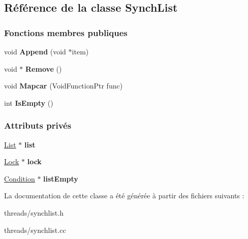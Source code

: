 \hypertarget{class_synch_list}{}\subsection{Référence de la classe Synch\+List}
\label{class_synch_list}
\subsubsection*{Fonctions membres publiques}
\begin{DoxyCompactItemize}
\item 
\hypertarget{class_synch_list_a8cd56b067f02d53025d8078f748e6b75}{}\label{class_synch_list_a8cd56b067f02d53025d8078f748e6b75} 
void {\bfseries Append} (void $\ast$item)
\item 
\hypertarget{class_synch_list_afe8d909e1ab9dce01ddd7d24716be56f}{}\label{class_synch_list_afe8d909e1ab9dce01ddd7d24716be56f} 
void $\ast$ {\bfseries Remove} ()
\item 
\hypertarget{class_synch_list_ac9faf4621078baddee6890b0e184fc2d}{}\label{class_synch_list_ac9faf4621078baddee6890b0e184fc2d} 
void {\bfseries Mapcar} (Void\+Function\+Ptr func)
\item 
\hypertarget{class_synch_list_ab396fbf17dbc09aa77ace8e3e3ac6910}{}\label{class_synch_list_ab396fbf17dbc09aa77ace8e3e3ac6910} 
int {\bfseries Is\+Empty} ()
\end{DoxyCompactItemize}
\subsubsection*{Attributs privés}
\begin{DoxyCompactItemize}
\item 
\hypertarget{class_synch_list_a54823dd859260a340ffbf55adae36d03}{}\label{class_synch_list_a54823dd859260a340ffbf55adae36d03} 
\hyperlink{class_list}{List} $\ast$ {\bfseries list}
\item 
\hypertarget{class_synch_list_a58f52391bca6a2ff302dfed934be8c80}{}\label{class_synch_list_a58f52391bca6a2ff302dfed934be8c80} 
\hyperlink{class_lock}{Lock} $\ast$ {\bfseries lock}
\item 
\hypertarget{class_synch_list_a6c4522f7b6fe8d9dc5fac23d80986d8c}{}\label{class_synch_list_a6c4522f7b6fe8d9dc5fac23d80986d8c} 
\hyperlink{class_condition}{Condition} $\ast$ {\bfseries list\+Empty}
\end{DoxyCompactItemize}


La documentation de cette classe a été générée à partir des fichiers suivants \+:\begin{DoxyCompactItemize}
\item 
threads/synchlist.\+h\item 
threads/synchlist.\+cc\end{DoxyCompactItemize}
